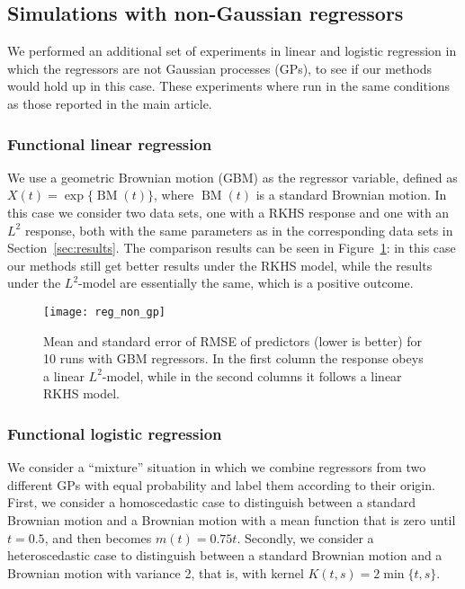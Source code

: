 \subsection{Simulations with non-Gaussian regressors}\label{app:non-gp}

We performed an additional set of experiments in linear and logistic regression in which the regressors are not Gaussian processes (GPs), to see if our methods would hold up in this case. These experiments where run in the same conditions as those reported in the main article.

\subsubsection*{Functional linear regression}

We use a geometric Brownian motion (GBM) as the regressor variable, defined as \(X(t)=\exp\{{\operatorname{BM}(t)}\}\), where \(\operatorname{BM}(t)\) is a standard Brownian motion. In this case we consider two data sets, one with a RKHS response and one with an \(L^2\) response, both with the same parameters as in the corresponding data sets in Section~\ref{sec:results}. The comparison results can be seen in Figure~\ref{fig:reg_non_gp}: in this case our methods still get better results under the RKHS model, while the results under the \(L^2\)-model are essentially the same, which is a positive outcome.

\begin{figure}[ht!]
  \centering
  \texttt{[image: reg\_non\_gp]}
  \caption{Mean and standard error of RMSE of predictors (lower is better) for 10 runs with GBM regressors. In the first column the response obeys a linear \(L^2\)-model, while in the second columns it follows a linear RKHS model.}\label{fig:reg_non_gp}
\end{figure}

\subsubsection*{Functional logistic regression}

We consider a ``mixture'' situation in which we combine regressors from two different GPs with equal probability and label them according to their origin. First, we consider a homoscedastic case to distinguish between a standard Brownian motion and a Brownian motion with a mean function that is zero until \(t=0.5\), and then becomes \(m(t)=0.75t\). Secondly, we consider a heteroscedastic case to distinguish between a standard Brownian motion and a Brownian motion with variance 2, that is, with kernel \(K(t,s)=2\min\{t,s\}\). 

